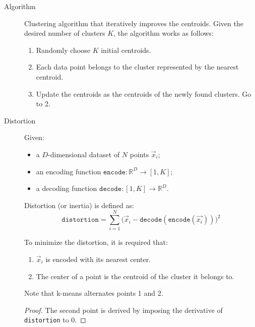 \begin{description}
    \item[Algorithm] 
        Clustering algorithm that iteratively improves the centroids.
        Given the desired number of clusters $K$, the algorithm works as follows:
        \begin{enumerate}
            \item Randomly choose $K$ initial centroids.
            \item Each data point belongs to the cluster represented by the nearest centroid.
            \item Update the centroids as the centroids of the newly found clusters. Go to 2.
        \end{enumerate}

    \item[Distortion] \label{desc:distortion} 
        Given:
        \begin{itemize}
            \item a $D$-dimensional dataset of $N$ points $\vec{x}_i$;
            \item an encoding function $\texttt{encode}: \mathbb{R}^D \rightarrow [1, K]$;
            \item a decoding function $\texttt{decode}: [1, K] \rightarrow \mathbb{R}^D$.
        \end{itemize}
        Distortion (or inertia) is defined as:
        \[ \texttt{distortion} = \sum_{i=1}^{N} \big(\vec{x}_i - \texttt{decode}(\texttt{encode}(\vec{x_i})) \big)^2 \]

        \begin{theorem}
            To minimize the distortion, it is required that:
            \begin{enumerate}
                \item $\vec{x}_i$ is encoded with its nearest center.
                \item The center of a point is the centroid of the cluster it belongs to.
            \end{enumerate}

            Note that k-means alternates points 1 and 2.

            \begin{proof}
                The second point is derived by imposing the derivative of \texttt{distortion} to 0.
            \end{proof}
        \end{theorem}


\end{description}
